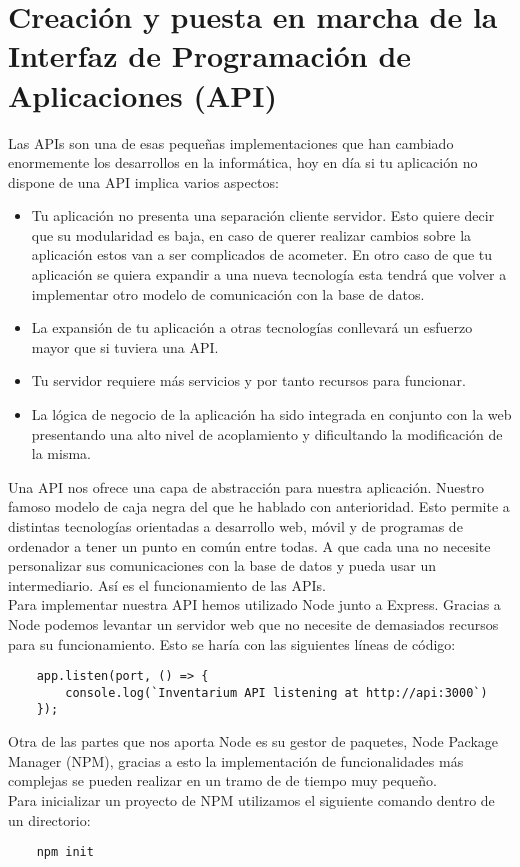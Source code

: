\section{Creación y puesta en marcha de la Interfaz de Programación de Aplicaciones (API)}
Las APIs son una de esas pequeñas implementaciones que han cambiado enormemente los desarrollos en la informática, hoy en día si tu aplicación no dispone de una API implica varios aspectos:

\begin{itemize}
    \item Tu aplicación no presenta una separación cliente servidor. Esto quiere decir que su modularidad es baja, en caso de querer realizar cambios sobre la aplicación estos van a ser complicados de acometer. En otro caso de que tu aplicación se quiera expandir a una nueva tecnología esta tendrá que volver a implementar otro modelo de comunicación con la base de datos.
    \item La expansión de tu aplicación a otras tecnologías conllevará un esfuerzo mayor que si tuviera una API.
    \item Tu servidor requiere más servicios y por tanto recursos para funcionar.
    \item La lógica de negocio de la aplicación ha sido integrada en conjunto con la web presentando una alto nivel de acoplamiento y dificultando la modificación de la misma.
\end{itemize}

Una API nos ofrece una capa de abstracción para nuestra aplicación. Nuestro famoso modelo de caja negra del que he hablado con anterioridad. Esto permite a distintas tecnologías orientadas a desarrollo web, móvil y de programas de ordenador a tener un punto en común entre todas. A que cada una no necesite personalizar sus comunicaciones con la base de datos y pueda usar un intermediario. Así es el funcionamiento de las APIs.
\\Para implementar nuestra API hemos utilizado Node junto a Express. Gracias a Node podemos levantar un servidor web que no necesite de demasiados recursos para su funcionamiento. Esto se haría con las siguientes líneas de código:
\begin{verbatim}
    app.listen(port, () => {
        console.log(`Inventarium API listening at http://api:3000`)
    });
\end{verbatim}
Otra de las partes que nos aporta Node es su gestor de paquetes, Node Package Manager (NPM), gracias a esto la implementación de funcionalidades más complejas se pueden realizar en un tramo de de tiempo muy pequeño.
\\Para inicializar un proyecto de NPM utilizamos el siguiente comando dentro de un directorio:
\begin{verbatim}
    npm init
\end{verbatim}

